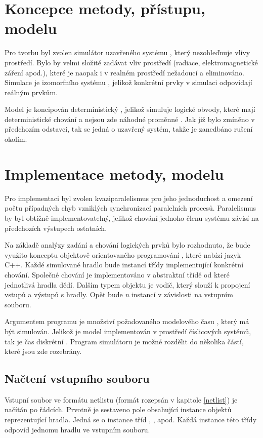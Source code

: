 \documentclass[11pt,a4paper]{article}
\begin{document}
	\section{Koncepce metody, přístupu, modelu}

		Pro tvorbu byl zvolen simulátor uzavřeného systému , který nezohleďnuje vlivy prostředí. Bylo by velmi složité zadávat vliv prostředí (radiace, elektromagnetické záření apod.), které je naopak i v realném prostředí nežadoucí a eliminováno. Simulace je izomorfního systému , jelikož konkrétní prvky v simulaci odpovídají reálným prvkům.

		Model je koncipován deterministický , jelikož simuluje logické obvody, které mají deterministické chování a nejsou zde náhodné proměnné . Jak již bylo zmíněno v předchozím odstavci, tak se jedná o uzavřený systém, takže je zanedbáno rušení okolím.


	\section{Implementace metody, modelu}

		Pro implementaci byl zvolen kvaziparalelismus  pro jeho jednoduchost a omezení počtu případných chyb vzniklých synchronizací paralelních procesů. Paralelismus by byl obtížně implementovatelný, jelikož chování jednoho členu systému závisí na předchozích výstupech ostatních.

		Na základě analýzy zadání a chování logických prvků bylo rozhodnuto, že bude využito konceptu objektově orientovaného programování , které nabízí jazyk C++. Každé simulované hradlo bude instancí třídy implementující konkrétní chování. Společné chování je implementováno v abstraktní třídě od které jednotlivá hradla dědí. Dalším typem objektu je vodič, který slouží k propojení vstupů a výstupů s hradly. Opět bude \textit{n} instancí v závislosti na vstupním souboru.

		Argumentem programu je množství požadovaného modelového času , který má být simulován. Jelikož je model implementován v prostředí číslicových systémů, tak je čas diskrétní . Program simulátoru je možné rozdělit do několika částí, které jsou zde rozebrány.

		\subsection{Načtení vstupního souboru}
			Vstupní soubor ve formátu netlistu (formát rozepsán v kapitole \ref{netlist}) je načítán po řádcích. Prvotně je sestaveno pole obsahující instance objektů reprezentující hradla. Jedná se o instance tříd , ,  apod. Každá instance této třídy odpovíd jednomu hradlu ve vstupním souboru.
\end{document}
